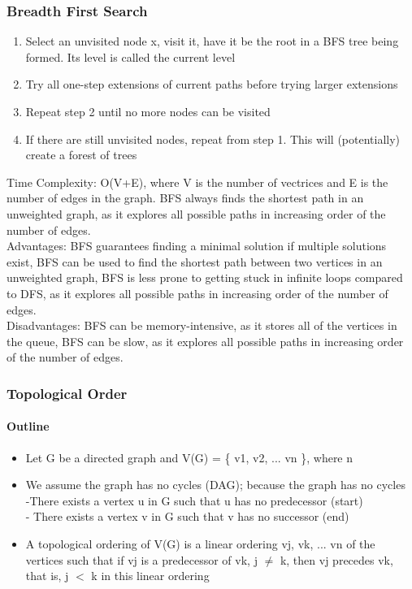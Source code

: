 \documentclass[10pt]{article}
\begin{document}
\subsubsection{Breadth First Search}
\begin{enumerate}
    \item Select an unvisited node x, visit it, have it be the root in a BFS tree being formed. Its level is called the current level
    \item Try all one-step extensions of current paths before trying larger extensions
    \item Repeat step 2 until no more nodes can be visited
    \item If there are still unvisited nodes, repeat from step 1.  This will (potentially) create a forest of trees
\end{enumerate}
Time Complexity: O(V+E), where V is the number of vectrices and E is the number of edges in the graph.
BFS always finds the shortest path in an unweighted graph, as it explores all possible paths in increasing order of the number of edges. \\
Advantages: BFS guarantees finding a minimal solution if multiple solutions exist, BFS can be used to find the shortest path between two vertices in an unweighted graph, BFS is less prone to getting stuck in infinite loops compared to DFS, as it explores all possible paths in increasing order of the number of edges.\\
Disadvantages: BFS can be memory-intensive, as it stores all of the vertices in the queue, BFS can be slow, as it explores all possible paths in increasing order of the number of edges.

\subsubsection{Topological Order}
\paragraph{Outline}
\begin{itemize}
    \item Let G be a directed graph and V(G) = \{ v1, v2, ... vn \}, where n 
    \item We assume the graph has no cycles (DAG); because the graph has no cycles\\
          -There exists a vertex u in G such that u has no predecessor (start)\\
          - There exists a vertex v in G such that v has no successor (end)
    \item A topological ordering of V(G) is a linear ordering vj, vk, ... vn of the vertices such that if vj is a predecessor of vk, j $\ne$ k, then vj precedes vk, that is, j $<$ k in this linear ordering
\end{itemize}
\end{document}
